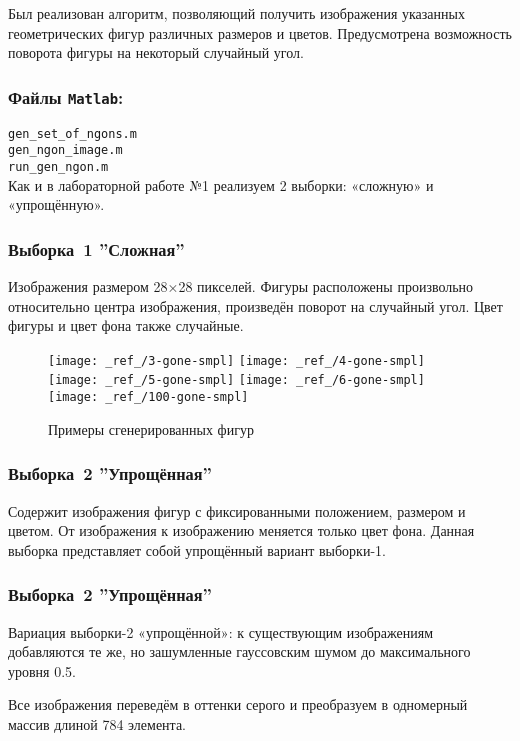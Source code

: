 \documentclass[12pt,a4paper]{article}
\begin{document}
Был реализован алгоритм, позволяющий получить изображения указанных геометрических фигур различных размеров и цветов. Предусмотрена возможность поворота фигуры на некоторый случайный угол.

\subsubsection*{Файлы \texttt{Matlab}:}
\verb|gen_set_of_ngons.m|\\
\verb|gen_ngon_image.m|\\
\verb|run_gen_ngon.m|\\[6pt]

Как и в лабораторной работе №1 реализуем 2 выборки: «сложную» и «упрощённую». 

\subsubsection*{Выборка \textnumero\,1 ''Сложная''}
Изображения размером 28×28 пикселей. Фигуры расположены произвольно относительно центра изображения, произведён поворот на случайный угол. Цвет фигуры и цвет фона также случайные.

\begin{figure}[H]
	\centering
	\texttt{[image: \_ref\_/3-gone-smpl]}	
	\texttt{[image: \_ref\_/4-gone-smpl]}
	\texttt{[image: \_ref\_/5-gone-smpl]}	
	\texttt{[image: \_ref\_/6-gone-smpl]}	
	\texttt{[image: \_ref\_/100-gone-smpl]}						
	\caption{Примеры сгенерированных фигур}
	\label{fig:05}
\end{figure}

\subsubsection*{Выборка \textnumero\,2 ''Упрощённая''}
Содержит изображения фигур с фиксированными положением, размером и цветом. От изображения к изображению меняется только цвет фона.  Данная выборка представляет собой упрощённый вариант выборки-1.

\subsubsection*{Выборка \textnumero\,2 ''Упрощённая''}
Вариация выборки-2 «упрощённой»: к существующим изображениям добавляются те же, но зашумленные гауссовским шумом до максимального уровня 0.5.

Все изображения переведём в оттенки серого и преобразуем в одномерный массив длиной 784 элемента. 
\end{document}
